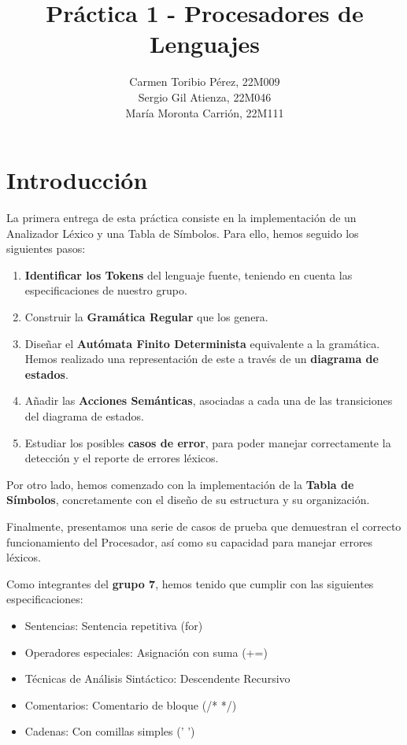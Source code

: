 \documentclass{article}
\title{Práctica 1 - Procesadores de Lenguajes}
\author{Carmen Toribio Pérez, 22M009\\Sergio Gil Atienza, 22M046\\María Moronta Carrión, 22M111}
\date{} %
\begin{document}
\maketitle

\section{Introducción}

La primera entrega de esta práctica consiste en la implementación de un Analizador Léxico y una Tabla de Símbolos. Para ello, hemos seguido los siguientes pasos: 
\begin{enumerate}
    \item \textbf{Identificar los Tokens} del lenguaje fuente, teniendo en cuenta las especificaciones de nuestro grupo.
    \item Construir la \textbf{Gramática Regular} que los genera.
    \item Diseñar el \textbf{Autómata Finito Determinista} equivalente a la gramática. Hemos realizado una representación de este a través de un \textbf{diagrama de estados}.
    \item Añadir las \textbf{Acciones Semánticas}, asociadas a cada una de las transiciones del diagrama de estados.
    \item Estudiar los posibles \textbf{casos de error}, para poder manejar correctamente la detección y el reporte de errores léxicos. 
\end{enumerate}

 \vspace{0.5cm}
 
 Por otro lado, hemos comenzado con la implementación de la \textbf{Tabla de Símbolos}, concretamente con el diseño de su estructura y su organización.

 \vspace{0.5cm}
 
 Finalmente, presentamos una serie de casos de prueba que demuestran el correcto funcionamiento del Procesador, así como su capacidad para manejar errores léxicos.
 
 \vspace{0.5cm}

Como integrantes del \textbf{grupo 7}, hemos tenido que cumplir con las siguientes especificaciones: 
\begin{itemize}[left=2cm]
    \item Sentencias: Sentencia repetitiva (for)
    \item Operadores especiales: Asignación con suma (+=)
    \item Técnicas de Análisis Sintáctico: Descendente Recursivo
    \item Comentarios: Comentario de bloque (/* */)
    \item Cadenas: Con comillas simples (' ')
\end{itemize}
\end{document}
